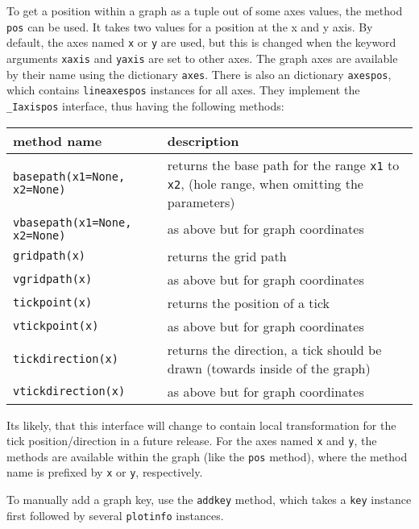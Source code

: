 To get a position within a graph as a tuple out of some axes values,
the method \verb|pos| can be used. It takes two values for a position
at the x and y axis. By default, the axes named \verb|x| or \verb|y|
are used, but this is changed when the keyword arguments \verb|xaxis|
and \verb|yaxis| are set to other axes. The graph axes are available
by their name using the dictionary \verb|axes|. There is also an
dictionary \verb|axespos|, which contains \verb|lineaxespos| instances
for all axes. They implement the \verb|_Iaxispos| interface, thus
having the following methods:

\medskip
\begin{tabularx}{\linewidth}{l>{\raggedright\arraybackslash}X}
method name&description\\
\hline
\texttt{basepath(x1=None, x2=None)}&returns the base path for the
range \texttt{x1} to \texttt{x2}, (hole range, when omitting the
parameters)\\
\texttt{vbasepath(x1=None, x2=None)}&as above but for graph coordinates\\
\texttt{gridpath(x)}&returns the grid path\\
\texttt{vgridpath(x)}&as above but for graph coordinates\\
\texttt{tickpoint(x)}&returns the position of a tick\\
\texttt{vtickpoint(x)}&as above but for graph coordinates\\
\texttt{tickdirection(x)}&returns the direction, a tick should be
drawn (towards inside of the graph)\\
\texttt{vtickdirection(x)}&as above but for graph coordinates\\
\end{tabularx}
\medskip

Its likely, that this interface will change to contain local
transformation for the tick position/direction in a future release.
For the axes named \verb|x| and \verb|y|, the methods are available
within the graph (like the \verb|pos| method), where the method name
is prefixed by \verb|x| or \verb|y|, respectively.

To manually add a graph key, use the \verb|addkey| method, which takes
a \verb|key| instance first followed by several \verb|plotinfo|
instances.

